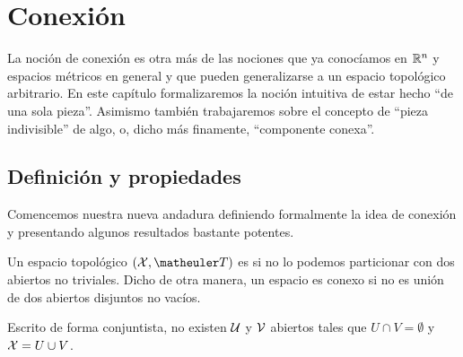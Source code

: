 \chapter{Conexión}
\label{conex}
La noción de conexión es otra más de las nociones que ya conocíamos en $\mathbb{R}^n$ y espacios métricos en general y que pueden generalizarse a un espacio topológico arbitrario. En este capítulo formalizaremos la noción intuitiva de estar hecho ``de una sola pieza''. Asimismo también trabajaremos sobre el concepto de ``pieza indivisible'' de algo, o, dicho más finamente, ``componente conexa''. 
\section{Definición y propiedades}
Comencemos nuestra nueva andadura definiendo formalmente la idea de conexión y presentando algunos resultados bastante potentes.

\begin{defi}[Conexión]
	Un espacio topológico $(\X,\T)$ es   si no lo podemos particionar con dos abiertos no triviales. Dicho de otra manera, un espacio es conexo si no es unión de dos abiertos disjuntos no vacíos.
	
	Escrito de forma conjuntista, no existen $\mathcal{U}$ y $\mathcal{V}$ abiertos tales que $U\cap V=\emptyset$ y $\mathcal{X}=U\cup V$.
\end{defi}

